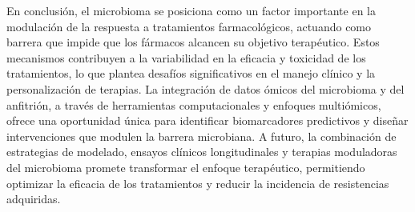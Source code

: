 En conclusión, el microbioma se posiciona como un factor importante en la modulación de la respuesta a tratamientos farmacológicos, actuando como barrera que impide que los fármacos alcancen su objetivo terapéutico. Estos mecanismos contribuyen a la variabilidad en la eficacia y toxicidad de los tratamientos, lo que plantea desafíos significativos en el manejo clínico y la personalización de terapias. La integración de datos ómicos del microbioma y del anfitrión, a través de herramientas computacionales y enfoques multiómicos, ofrece una oportunidad única para identificar biomarcadores predictivos y diseñar intervenciones que modulen la barrera microbiana. A futuro, la combinación de estrategias de modelado, ensayos clínicos longitudinales y terapias moduladoras del microbioma promete transformar el enfoque terapéutico, permitiendo optimizar la eficacia de los tratamientos y reducir la incidencia de resistencias adquiridas.